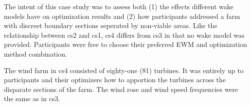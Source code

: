 The intent of this case study was to assess both
(1) the effects different wake models have on optimization results and
(2) how participants addressed a farm with discreet boundary sections seperated by non-viable areas.
Like the relationship between cs2 and cs1, cs4 differs from cs3 in that no wake model was provided.
Participants were free to choose their preferred EWM and optimization method combination.


The wind farm in cs4 consisted of eighty-one (81) turbines.
It was entirely up to participants and their optimizers how to apportion the turbines across the disparate sections of the farm.
The wind rose and wind speed frequencies were the same as in cs3.